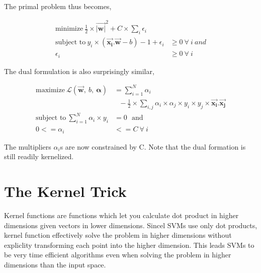 \documentclass[11pt, a4paper]{article}
\begin{document}
The primal problem thus becomes,

\begin{align*}
	\text{minimize}\ \frac{1}{2} \times {\vec{\mathbf{|w|}}^2} + C \times \sum\limits_i \epsilon_i &                    \\ \text{subject to}\ y_i \times (\vec{\mathbf{x_i}}.\vec{\mathbf{w}} - b) - 1 + \epsilon_i &\geq 0\ \forall\ i\ and \\
	\epsilon_i                                                                                     & \geq 0\ \forall\ i 
\end{align*}

The dual formulation is also surprisingly similar,

\begin{align*}
	\text{maximize}\ \mathscr{L}(\vec{\mathbf{w}},\ b,\ \bm{\alpha}) & = \sum\limits_{i = 1}^N \alpha_i                                                                                                            \\ 
	                                                                 & \ \ \ - \frac{1}{2} \times \sum\limits_{i, j} \alpha_i \times \alpha_j \times y_i \times y_j \times \vec{\mathbf{x_i}} . \vec{\mathbf{x_j}} \\
	\text{subject to}\ \sum\limits_{i = 1}^N \alpha_i \times y_i     & = 0\ \ \ \text{and}                                                                                                                         \\
	0 <= \alpha_i                                                    & <= C\ \forall\ i                                                                                                                            
\end{align*}

The multipliers $\alpha_i$s are now constrained by C. Note that the dual formation is still readily kernelized.

\section*{The Kernel Trick}

Kernel functions are functions which let you calculate dot product in higher dimensions given vectors in lower dimensions. Sincel SVMs use only dot products, kernel function effectively solve the problem in higher dimensions without expliclity transforming each point into the higher dimension. This leads SVMs to be very time efficient algorithms even when solving the problem in higher dimensions than the input space.
\end{document}

